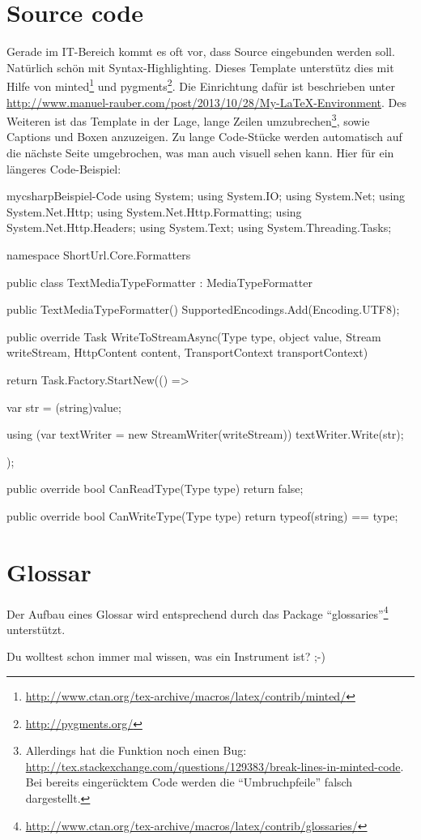 \section{Source code}

Gerade im IT-Bereich kommt es oft vor, dass Source eingebunden werden soll. Natürlich schön mit Syntax-Highlighting. 
Dieses Template unterstütz dies mit Hilfe von minted\footnote{\url{http://www.ctan.org/tex-archive/macros/latex/contrib/minted/}} und pygments\footnote{\url{http://pygments.org/}}. Die Einrichtung dafür ist beschrieben unter \url{http://www.manuel-rauber.com/post/2013/10/28/My-LaTeX-Environment}.
Des Weiteren ist das Template in der Lage, lange Zeilen umzubrechen\footnote{Allerdings hat die Funktion noch einen Bug: \url{http://tex.stackexchange.com/questions/129383/break-lines-in-minted-code}. Bei bereits eingerücktem Code werden die \enquote{Umbruchpfeile} falsch dargestellt.}, sowie Captions und Boxen anzuzeigen. Zu lange Code-Stücke werden automatisch auf die nächste Seite umgebrochen, was man auch visuell sehen kann. Hier für ein längeres Code-Beispiel:

\begin{listingsbox}{mycsharp}{Beispiel-Code}
using System;
using System.IO;
using System.Net;
using System.Net.Http;
using System.Net.Http.Formatting;
using System.Net.Http.Headers;
using System.Text;
using System.Threading.Tasks;

namespace ShortUrl.Core.Formatters
{
	public class TextMediaTypeFormatter : MediaTypeFormatter
	{
		public TextMediaTypeFormatter()
		{
			SupportedEncodings.Add(Encoding.UTF8);
		}

		public override Task WriteToStreamAsync(Type type, object value, Stream writeStream, HttpContent content,
			TransportContext transportContext)
		{
			return Task.Factory.StartNew(() =>
			{

				var str = (string)value;

				using (var textWriter = new StreamWriter(writeStream))
				{
					textWriter.Write(str);
				}
			});
		}

		public override bool CanReadType(Type type)
		{
			return false;
		}

		public override bool CanWriteType(Type type)
		{
			return typeof(string) == type;
		}
	}
}
\end{listingsbox}

\section{Glossar}

Der Aufbau eines Glossar wird entsprechend durch das Package \enquote{glossaries}\footnote{\url{http://www.ctan.org/tex-archive/macros/latex/contrib/glossaries/}} unterstützt.

Du wolltest schon immer mal wissen, was ein \gls{Instrument} ist? ;-)

